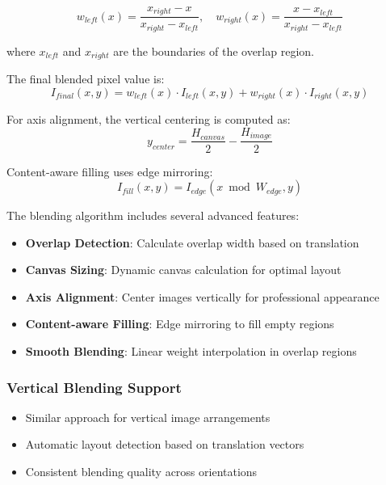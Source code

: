 \documentclass[12pt,a4paper]{article}
\begin{document}
\begin{equation}
w_{left}(x) = \frac{x_{right} - x}{x_{right} - x_{left}}, \quad w_{right}(x) = \frac{x - x_{left}}{x_{right} - x_{left}}
\end{equation}

where $x_{left}$ and $x_{right}$ are the boundaries of the overlap region.

The final blended pixel value is:
\begin{equation}
I_{final}(x,y) = w_{left}(x) \cdot I_{left}(x,y) + w_{right}(x) \cdot I_{right}(x,y)
\end{equation}

For axis alignment, the vertical centering is computed as:
\begin{equation}
y_{center} = \frac{H_{canvas}}{2} - \frac{H_{image}}{2}
\end{equation}

Content-aware filling uses edge mirroring:
\begin{equation}
I_{fill}(x,y) = I_{edge}(x \bmod W_{edge}, y)
\end{equation}

The blending algorithm includes several advanced features:
\begin{itemize}
    \item \textbf{Overlap Detection}: Calculate overlap width based on translation
    \item \textbf{Canvas Sizing}: Dynamic canvas calculation for optimal layout
    \item \textbf{Axis Alignment}: Center images vertically for professional appearance
    \item \textbf{Content-aware Filling}: Edge mirroring to fill empty regions
    \item \textbf{Smooth Blending}: Linear weight interpolation in overlap regions
\end{itemize}

\subsubsection{Vertical Blending Support}
\begin{itemize}
    \item Similar approach for vertical image arrangements
    \item Automatic layout detection based on translation vectors
    \item Consistent blending quality across orientations
\end{itemize}
\end{document}
